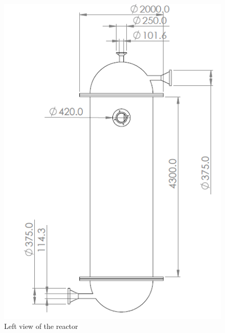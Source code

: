 \begin{figure}[h]
\begin{minipage}[t]{0.49\linewidth}
        \includegraphics[width=\linewidth]{chapters/2-reaction/figures/FYD reactor left view with calc.PNG}
        \caption{Left view of the reactor}
        \label{fig:reactorleft}
    \end{minipage}
\end{figure}

\begin{figure}
    \centering

\end{figure}

